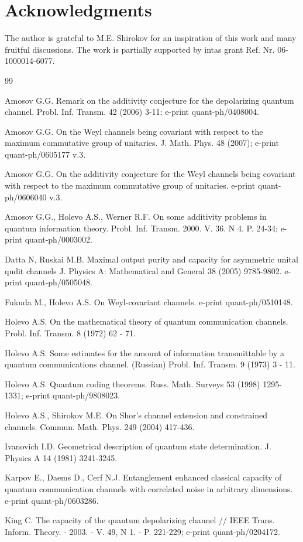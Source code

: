 \documentclass[twocolumn,showpacs,preprintnumbers,amsmath,amssymb]{revtex4}
\begin{document}
\section*{Acknowledgments}

The author is grateful to M.E. Shirokov for an inspiration of this
work and many fruitful discussions. The work is partially
supported by intas grant Ref. Nr. 06-1000014-6077.


\begin {thebibliography}{99}

 Amosov G.G. Remark on the additivity conjecture for
the depolarizing quantum channel. Probl. Inf. Transm. 42 (2006)
3-11; e-print quant-ph/0408004.

 Amosov G.G. On the Weyl  channels being covariant
with respect to the maximum commutative group of unitaries. J.
Math. Phys. 48 (2007); e-print quant-ph/0605177 v.3.


 Amosov G.G. On the additivity conjecture for the
Weyl channels being covariant with respect to the maximum
commutative group of unitaries. e-print quant-ph/0606040 v.3.


 Amosov G.G., Holevo A.S., Werner R.F. On some additivity problems in
quantum information theory.  Probl. Inf. Transm. 2000. V. 36. N 4.
P. 24-34; e-print quant-ph/0003002.

 Datta N, Ruskai M.B. Maximal output purity and capacity for asymmetric unital qudit channels
J. Physics A: Mathematical and General 38 (2005) 9785-9802.
e-print quant-ph/0505048.

 Fukuda M., Holevo A.S. On Weyl-covariant
channels. e-print quant-ph/0510148.


 Holevo A.S. On the mathematical theory of quantum communication
channels. Probl. Inf. Transm. 8 (1972) 62 - 71.

 Holevo A.S. Some estimates for the amount of information
transmittable by a quantum communications channel. (Russian)
Probl. Inf. Transm. 9 (1973) 3 - 11.

 Holevo A.S. Quantum coding theorems. Russ.
Math. Surveys 53 (1998) 1295-1331; e-print quant-ph/9808023.


 Holevo A.S., Shirokov M.E. On Shor's channel
extension and constrained channels. Commun. Math. Phys. 249
(2004) 417-436.

 Ivanovich I.D. Geometrical description of quantum state
determination. J. Physics A 14 (1981) 3241-3245.


 Karpov E., Daems D., Cerf N.J. Entanglement
enhanced classical capacity of quantum communication channels
with correlated noise in arbitrary dimensions. e-print
quant-ph/0603286.


 King C. The capacity of the quantum depolarizing
channel // IEEE Trans. Inform. Theory. - 2003. - V. 49, N 1. - P.
221-229; e-print quant-ph/0204172.




\end {thebibliography}
\end{document}
